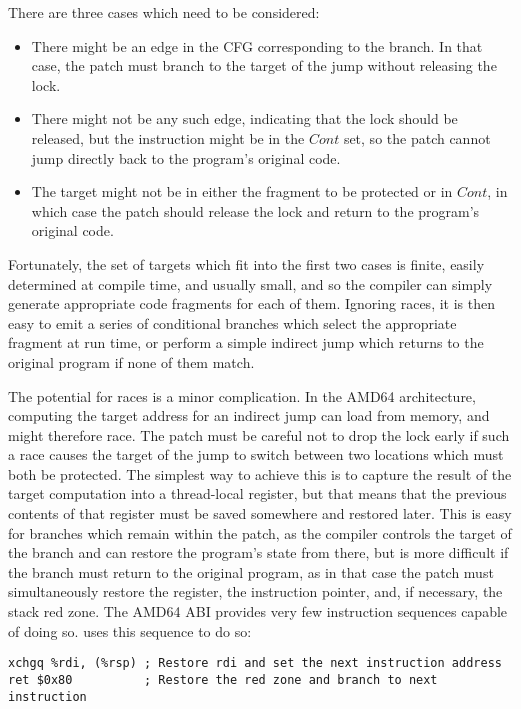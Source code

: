 There are three cases which need to be considered:

\begin{itemize}
\item There might be an edge in the CFG corresponding to the branch.
  In that case, the patch must branch to the target of the jump
  without releasing the lock.
\item There might not be any such edge, indicating that the lock
  should be released, but the instruction might be in the
  $\mathit{Cont}$ set, so the patch cannot jump directly back to the
  program's original code.
\item The target might not be in either the fragment to be protected
  or in $\mathit{Cont}$, in which case the patch should release the
  lock and return to the program's original code.
\end{itemize}

Fortunately, the set of targets which fit into the first two cases is
finite, easily determined at compile time, and usually small, and so
the compiler can simply generate appropriate code fragments for each
of them.  Ignoring races, it is then easy to emit a series of
conditional branches which select the appropriate fragment at run
time, or perform a simple indirect jump which returns to the original
program if none of them match.

The potential for races is a minor complication.  In the AMD64
architecture, computing the target address for an indirect jump can
load from memory, and might therefore race.  The patch must be careful
not to drop the lock early if such a race causes the target of the
jump to switch between two locations which must both be protected.
The simplest way to achieve this is to capture the result of the
target computation into a thread-local register, but that means that
the previous contents of that register must be saved somewhere and
restored later.  This is easy for branches which remain within the
patch, as the compiler controls the target of the branch and can
restore the program's state from there, but is more difficult if the
branch must return to the original program, as in that case the patch
must simultaneously restore the register, the instruction pointer,
and, if necessary, the stack red zone.  The AMD64 ABI provides very
few instruction sequences capable of doing so.  {\Implementation} uses
this sequence to do so:

\begin{verbatim}
xchgq %rdi, (%rsp) ; Restore rdi and set the next instruction address
ret $0x80          ; Restore the red zone and branch to next instruction
\end{verbatim}

